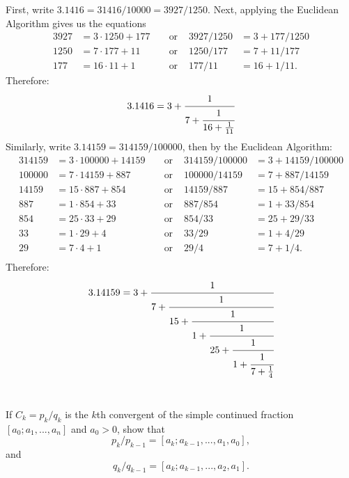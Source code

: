 \begin{solution}
    First, write $3.1416 = 31416/10000 = 3927/1250$. Next, applying the Euclidean Algorithm gives us the equations
    \begin{align*}
        3927 &= 3\cdot 1250 + 177 & &\text{ or } & 3927/1250 &= 3 + 177/1250 \\
        1250 &= 7\cdot 177 + 11 & &\text{ or } & 1250/177 &= 7 + 11/177 \\
        177 &= 16\cdot 11 + 1 & &\text{ or } & 177/11 &= 16 + 1/11.
    \end{align*}
    Therefore:
    $$3.1416 = 
    3 + \cfrac{1}{
        7 + \cfrac{1}{
            16 + \frac{1}{11}
        }
    }$$
    Similarly, write $3.14159 = 314159/100000$, then by the Euclidean Algorithm:
    \begin{align*}
        314159 &= 3\cdot 100000+14159 & &\text{ or } & 314159/100000 &= 3+14159/100000 \\
        100000 &= 7\cdot 14159 + 887 & &\text{ or } & 100000/14159 &= 7 + 887/14159 \\
        14159 &= 15\cdot 887 + 854 & &\text{ or } & 14159/887 &= 15 + 854/887 \\
        887 &= 1\cdot 854 + 33 & &\text{ or } & 887/854 &= 1 + 33/854 \\
        854 &= 25\cdot 33 + 29 & &\text{ or } & 854/33 &= 25 + 29/33 \\
        33 &= 1\cdot 29 + 4 & &\text{ or } & 33/29 &= 1 + 4/29 \\
        29 &= 7\cdot 4 + 1 & &\text{ or } & 29/4 &= 7 + 1/4. \\
    \end{align*}
    Therefore:
    $$3.14159 = 
        3 + \cfrac{1}{
            7 + \cfrac{1}{
                15 + \cfrac{1}{
                    1 + \cfrac{1}{
                        25 + \cfrac{1}{
                            1 + \cfrac{1}{
                                7 + \frac{1}{
                                    4
                                }
                                }
                            }
                        }
                    }
                }
            }$$ \\
\end{solution}

\begin{exercise}
    If $C_k = p_k / q_k$ is the $k$th convergent of the simple continued fraction $[a_0; a_1, ..., a_n]$ and $a_0 > 0$, show that
    $$p_k/p_{k-1} = [a_k; a_{k-1}, ..., a_1, a_0],$$
    and
    $$q_k/q_{k-1} = [a_k; a_{k-1}, ..., a_2, a_1].$$
    $$ \\
\end{exercise}

